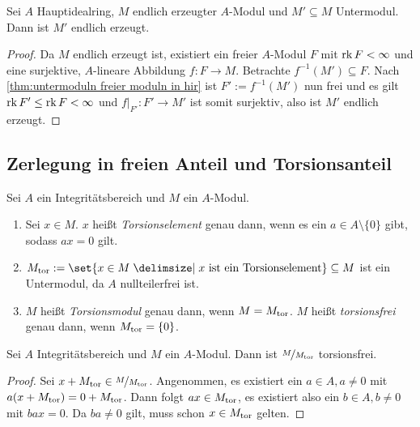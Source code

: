 \documentclass[12pt,a4paper]{scrartcl}
\theoremstyle{cplain}
\theoremstyle{cdef}
\begin{document}
\begin{kor}
	Sei $A$ Hauptidealring, $M$ endlich erzeugter $A$-Modul und $M'\subseteq M$ Untermodul. Dann ist $M'$ endlich erzeugt.
\end{kor}
\begin{proof}
	Da $M$ endlich erzeugt ist, existiert ein freier $A$-Modul $F$ mit $\operatorname{rk} F<\infty$ und eine surjektive, $A$-lineare Abbildung $f\colon F\to M$. Betrachte $f^{-1}(M')\subseteq F$. Nach \cref{thm:untermoduln freier moduln in hir} ist $F' := f^{-1}(M')$ nun frei und es gilt $\operatorname{rk} F'\le \operatorname{rk} F <\infty$ und $f|_{F'}\colon F'\to M'$ ist somit surjektiv, also ist $M'$ endlich erzeugt.
\end{proof}


\subsection{Zerlegung in freien Anteil und Torsionsanteil}
\begin{defi}
	Sei $A$ ein Integritätsbereich und $M$ ein $A$-Modul.
	\begin{enumerate}
		\item Sei $x\in M$. $x$ heißt \emph{Torsionselement} genau dann, wenn es ein $a\in A\setminus\{0\}$ gibt, sodass $ax = 0$ gilt.
		\item $M_{\tor} := \set{x\in M \given x \text{ ist ein Torsionselement}}\subseteq M$ ist ein Untermodul, da $A$ nullteilerfrei ist.
		\item $M$ heißt \emph{Torsionsmodul }genau dann, wenn $M = M_{\operatorname{tor}}$.
			  $M$ heißt \emph{torsionsfrei} genau dann, wenn $M_{\operatorname{tor}} = \{0\}$.
	\end{enumerate}
	
\end{defi}

\begin{lem} \label{lem:torsionsquotient torsionsfrei}
	Sei $A$ Integritätsbereich und $M$ ein $A$-Modul. Dann ist $\nicefrac{M}{M_{\operatorname{tor}}}$ torsionsfrei.
\end{lem}
\begin{proof}
	Sei $x+M_{\operatorname{tor}}\in \nicefrac{M}{M_{\operatorname{tor}}}$. Angenommen, es existiert ein $a\in A, a\neq 0$ mit $a(x+M_{\operatorname{tor}}) = 0+M_{\operatorname{tor}}$. Dann folgt $ax\in M_{\operatorname{tor}}$, es existiert also ein $b\in A, b\neq 0$ mit $bax = 0$. Da $ba\neq 0$ gilt, muss schon $x\in M_{\operatorname{tor}}$ gelten.
\end{proof}
\end{document}

